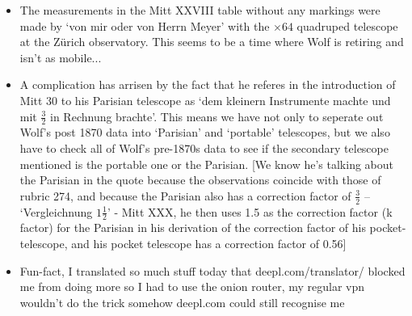 \documentclass[12pt]{article}
\begin{document}
\begin{itemize}
    \item The measurements in the Mitt XXVIII table without any markings were made by `von mir oder von Herrn Meyer' with the $\times 64$ quadruped telescope at the Zürich observatory. This seems to be a time where Wolf is retiring and isn't as mobile...
    \item A complication has arrisen by the fact that he referes in the introduction of Mitt 30 to his Parisian telescope as `dem kleinern Instrumente machte und mit $\frac{3}{2}$ in Rechnung brachte'. This means we have not only to seperate out Wolf's post 1870 data into `Parisian' and `portable' telescopes, but we also have to check all of Wolf's pre-1870s data to see if the secondary telescope mentioned is the portable one or the Parisian. [We know he's talking about the Parisian in the quote because the observations coincide with those of rubric 274, and because the Parisian also has a correction factor of $\frac{3}{2}$ -- `Vergleichnung $1\frac{1}{2}$' - Mitt XXX, he then uses 1.5 as the correction factor (k factor) for the Parisian in his derivation of the correction factor of his pocket-telescope, and his pocket telescope has a correction factor of 0.56]
    \item Fun-fact, I translated so much stuff today that deepl.com/translator/ blocked me from doing more so I had to use the onion router, my regular vpn wouldn't do the trick somehow deepl.com could still recognise me
    
    
\end{itemize}
\end{document}
